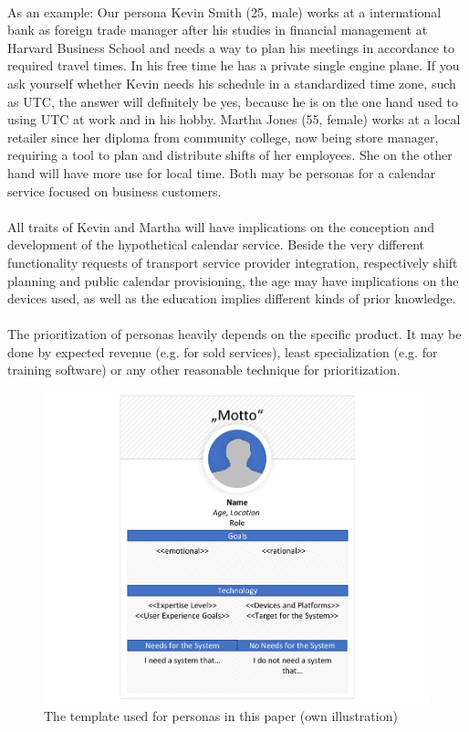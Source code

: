 \paragraph{} As an example: Our persona Kevin Smith (25, male) works at a international bank as foreign trade manager after his studies in financial management at Harvard Business School and needs a way to plan his meetings in accordance to required travel times. In his free time he has a private single engine plane. If you ask yourself whether Kevin needs his schedule in a standardized time zone, such as UTC, the answer will definitely be yes, because he is on the one hand used to using UTC at work and in his hobby. Martha Jones (55, female) works at a local retailer since her diploma from community college, now being store manager, requiring a tool to plan and distribute shifts of her employees. She on the other hand will have more use for local time. Both may be personas for a calendar service focused on business customers. 
\paragraph{} All traits of Kevin and Martha will have implications on the conception and development of the hypothetical calendar service. Beside the very different functionality requests of transport service provider integration, respectively shift planning and public calendar provisioning, the age may have implications on the devices used, as well as the education implies different kinds of prior knowledge. 
\paragraph{} The prioritization of personas heavily depends on the specific product. It may be done by expected revenue (e.g. for sold services), least specialization (e.g. for training software) or any other reasonable technique for prioritization.
\begin{figure}[H]
    \centering
    \includegraphics[scale=1]{img/PersonaTemplate.pdf}
    \caption[Template for Personas]{The template used for personas in this paper (own illustration)}
    \label{fig:persTemp}
\end{figure}
